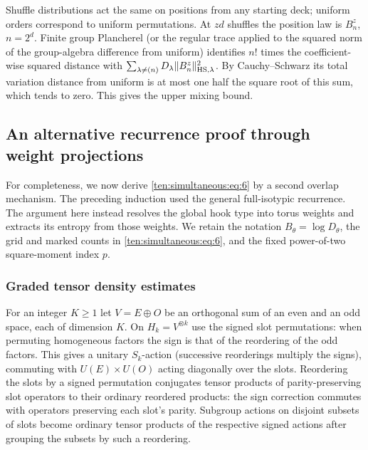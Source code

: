 Shuffle distributions act the same on positions from any starting deck; uniform orders correspond to uniform permutations. At \(zd\) shuffles the position law is \(B_n^z\), \(n=2^d\). Finite group Plancherel (or the regular trace applied to the squared norm of the group-algebra difference from uniform) identifies \(n!\) times the coefficient-wise squared distance with \(\sum_{\lambda\ne(n)}D_\lambda\|B_n^z\|_{{\rm HS},\lambda}^2\). By Cauchy--Schwarz its total variation distance from uniform is at most one half the square root of this sum, which tends to zero. This gives the upper mixing bound.

\subsection{An alternative recurrence proof through weight projections}

For completeness, we now derive \eqref{ten:simultaneous:eq:6} by a
second overlap mechanism. The preceding induction used the general
full-isotypic recurrence. The argument here instead resolves the global
hook type into torus weights and extracts its entropy from those weights.
We retain the notation $B_\theta=\log D_\theta$, the grid and marked
counts in \eqref{ten:simultaneous:eq:6}, and the fixed power-of-two
square-moment index $p$.

\subsubsection{Graded tensor density estimates}


For an integer \(K\ge 1\) let \(V=E\oplus O\) be an orthogonal sum of an even and an odd space, each of dimension \(K\). On \(H_k=V^{\otimes k}\) use the signed slot permutations: when permuting homogeneous factors the sign is that of the reordering of the odd factors. This gives a unitary \(S_k\)-action (successive reorderings multiply the signs), commuting with \(U(E)\times U(O)\) acting diagonally over the slots. Reordering the slots by a signed permutation conjugates tensor products of parity-preserving slot operators to their ordinary reordered products: the sign correction commutes with operators preserving each slot's parity. Subgroup actions on disjoint subsets of slots become ordinary tensor products of the respective signed actions after grouping the subsets by such a reordering.

